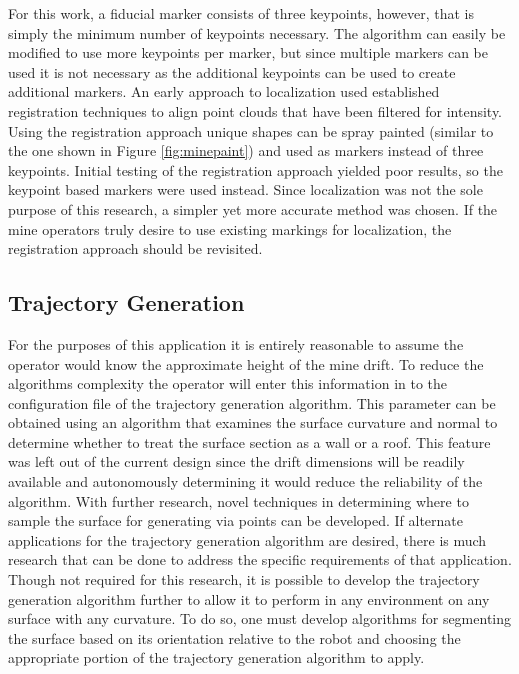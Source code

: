 For this work, a fiducial marker consists of three keypoints, however, that is simply the minimum number of keypoints necessary. The algorithm can easily be modified to use more keypoints per marker, but since multiple markers can be used it is not necessary as the additional keypoints can be used to create additional markers. An early approach to localization used established registration techniques to align point clouds that have been filtered for intensity. Using the registration approach unique shapes can be spray painted (similar to the one shown in Figure \ref{fig:minepaint}) and used as markers instead of three keypoints. Initial testing of the registration approach yielded poor results, so the keypoint based markers were used instead. Since localization was not the sole purpose of this research, a simpler yet more accurate method was chosen. If the mine operators truly desire to use existing markings for localization, the registration approach should be revisited.\\

\subsection{Trajectory Generation}

For the purposes of this application it is entirely reasonable to assume the operator would know the approximate height of the mine drift. To reduce the algorithms complexity the operator will enter this information in to the configuration file of the trajectory generation algorithm. This parameter can be obtained using an algorithm that examines the surface curvature and normal to determine whether to treat the surface section as a wall or a roof. This feature was left out of the current design since the drift dimensions will be readily available and autonomously determining it would reduce the reliability of the algorithm. With further research, novel techniques in determining where to sample the surface for generating via points can be developed. If alternate applications for the trajectory generation algorithm are desired, there is much research that can be done to address the specific requirements of that application. Though not required for this research, it is possible to develop the trajectory generation algorithm further to allow it to perform in any environment on any surface with any curvature. To do so, one must develop algorithms for segmenting the surface based on its orientation relative to the robot and choosing the appropriate portion of the trajectory generation algorithm to apply.\\

